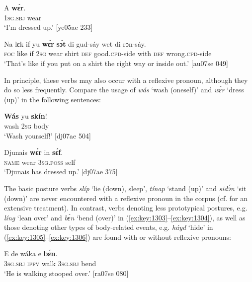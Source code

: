 \ea%
    \label{ex:key:1299}
    \gll A    \textbf{wɛ́r}.\\
\textsc{1sg.sbj}  wear\\

\glt ‘I’m dressed up.’ [ye05ae 233]
\z


\ea%
    \label{ex:key:1300}
    \gll Na  lɛk  if  yu  \textbf{wɛ́r}    \textbf{sɔ́t}    di  gud-sáy
wet    di  rɔn-sáy.\\
\textsc{foc}  like  if  \textsc{2sg}  wear  shirt  \textsc{def}  good\textsc{.cpd}{}-side
with    \textsc{def}  wrong\textsc{.cpd}{}-side\\

\glt ‘That’s like if you put on a shirt the right way or inside out.’ [au07se 049]
\z

In principle, these verbs may also occur with a reflexive pronoun, although they do so less frequently. Compare the usage of \textit{wás} ‘wash (oneself)’ and \textit{wɛ́r} ‘dress (up)’ in the following sentences: 


\ea%
    \label{ex:key:1301}
    \gll \textbf{Wás}    yu  \textbf{skín}!\\
wash  \textsc{2sg}  body\\

\glt ‘Wash yourself!’ [dj07ae 504]
\z


\ea%
    \label{ex:key:1302}
    \gll Djunais  \textbf{wɛ́r}    in    \textbf{sɛ́f}.\\
\textsc{name}  wear  \textsc{3sg.poss}  self\\

\glt ‘Djunais has dressed up.’ [dj07ae 375]
\z

The basic posture verbs \textit{slíp} ‘lie (down), sleep’, \textit{tínap} ‘stand (up)’ and \textit{sidɔ́n} ‘sit (down)’ are never encountered with a reflexive pronoun in the corpus (cf.  for an extensive treatment). In contrast, verbs denoting less prototypical postures, e.g. \textit{líng} ‘lean over’ and \textit{bɛ́n} ‘bend (over)’ in (\ref{ex:key:1303}–\ref{ex:key:1304}), as well as those denoting other types of body-related events, e.g. \textit{háyd} ‘hide’ in (\ref{ex:key:1305}–\ref{ex:key:1306}) are found with or without reflexive pronouns:


\ea%
    \label{ex:key:1303}
    \gll E    de  wáka  e    \textbf{bɛ́n}.\\
\textsc{3sg.sbj}  \textsc{ipfv}  walk  \textsc{3sg.sbj}  bend\\

\glt ‘He is walking stooped over.’ [ra07se 080]
\z


